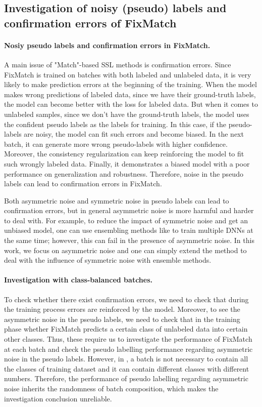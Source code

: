 \subsection{Investigation of noisy (pseudo) labels and confirmation errors of FixMatch}
\paragraph{Nosiy pseudo labels and confirmation errors in FixMatch.} A main issue of "Match"-based SSL methods is confirmation errors. 
Since FixMatch is trained on batches with both labeled and unlabeled data, it is very likely to make prediction errors at the beginning of the training.
When the model makes wrong predictions of labeled data, since we have their ground-truth labels, the model can become better with the loss for labeled data. But when it comes to unlabeled samples, since we don't have the ground-truth labels, the model uses the confident pseudo labels as the labels for training. In this case, if the pseudo-labels are noisy, the model can fit such errors and become biased. In the next batch, it can generate more wrong pseudo-labels with higher confidence. Moreover, the consistency regularization can keep reinforcing the model to fit such wrongly labeled data. Finally, it demonstrates a biased model with a poor performance on generalization and robustness. Therefore, noise in the pseudo labels can lead to confirmation errors in FixMatch.

Both asymmetric noise and symmetric noise in pseudo labels can lead to confirmation errors, but in general asymmetric noise is more harmful and harder to deal with. For example, to reduce the impact of symmetric noise and get an unbiased model, one can use ensembling methods like \citep{li2020dividemix} to train multiple DNNs at the same time; however, this can fail in the presence of asymmetric noise. %
In this work, we focus on asymmetric noise and one can simply extend the method to deal with the influence of symmetric noise with ensemble methods. 

\paragraph{Investigation with class-balanced batches.} To check whether there exist confirmation errors, we need to check that during the training process errors are reinforced by the model. Moreover, to see the asymmetric noise in the pseudo labels, we need to check that in the training phase whether FixMatch predicts a certain class of unlabeled data into certain other classes. Thus, these require us to investigate the performance of FixMatch at each batch and check the pseudo labelling performance regarding asymmetric noise in the pseudo labels. However, in \citep{sohn2020fixmatch}, a batch is not necessary to contain all the classes of training dataset and it can contain different classes with different numbers. Therefore, the performance of pseudo labelling regarding asymmetric noise inherits the randomness of batch composition, which makes the investigation conclusion unreliable. 

